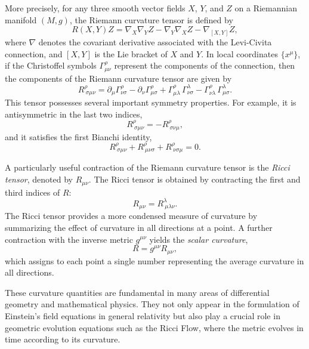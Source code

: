 More precisely, for any three smooth vector fields \( X \), \( Y \), and \( Z \) on a Riemannian manifold \((M, g)\), the Riemann curvature tensor is defined by
\[
R(X,Y)Z = \nabla_X \nabla_Y Z - \nabla_Y \nabla_X Z - \nabla_{[X,Y]} Z,
\]
where \(\nabla\) denotes the covariant derivative associated with the Levi-Civita connection, and \([X,Y]\) is the Lie bracket of \(X\) and \(Y\). In local coordinates \(\{x^\mu\}\), if the Christoffel symbols \(\Gamma^\rho_{\mu\nu}\) represent the components of the connection, then the components of the Riemann curvature tensor are given by
\[
R^\rho_{\ \sigma\mu\nu} = \partial_\mu \Gamma^\rho_{\nu\sigma} - \partial_\nu \Gamma^\rho_{\mu\sigma} + \Gamma^\rho_{\mu\lambda}\,\Gamma^\lambda_{\nu\sigma} - \Gamma^\rho_{\nu\lambda}\,\Gamma^\lambda_{\mu\sigma}.
\]
This tensor possesses several important symmetry properties. For example, it is antisymmetric in the last two indices,
\[
R^\rho_{\ \sigma\mu\nu} = -R^\rho_{\ \sigma\nu\mu},
\]
and it satisfies the first Bianchi identity,
\[
R^\rho_{\ \sigma\mu\nu} + R^\rho_{\ \mu\nu\sigma} + R^\rho_{\ \nu\sigma\mu} = 0.
\]

A particularly useful contraction of the Riemann curvature tensor is the \emph{Ricci tensor}, denoted by \( R_{\mu\nu} \). The Ricci tensor is obtained by contracting the first and third indices of \(R\):
\[
R_{\mu\nu} = R^\lambda_{\ \mu\lambda\nu}.
\]
The Ricci tensor provides a more condensed measure of curvature by summarizing the effect of curvature in all directions at a point. A further contraction with the inverse metric \( g^{\mu\nu} \) yields the \emph{scalar curvature},
\[
R = g^{\mu\nu} R_{\mu\nu},
\]
which assigns to each point a single number representing the average curvature in all directions.

These curvature quantities are fundamental in many areas of differential geometry and mathematical physics. They not only appear in the formulation of Einstein's field equations in general relativity but also play a crucial role in geometric evolution equations such as the Ricci Flow, where the metric evolves in time according to its curvature.